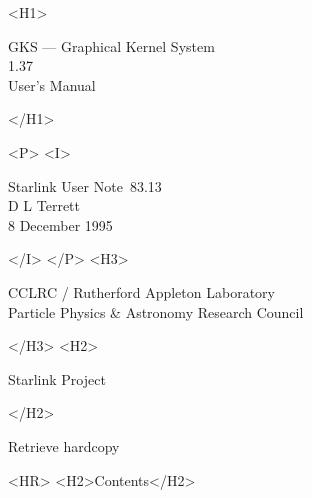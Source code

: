 \documentclass[11pt]{article}
\newcommand{\stardoccategory}  {Starlink User Note}
\newcommand{\stardocsource}    {sun83.13}
\newcommand{\stardocnumber}    {83.13}
\newcommand{\stardocauthors}   {D L Terrett}
\newcommand{\stardocdate}      {8 December 1995}
\newcommand{\stardoctitle}     {GKS --- Graphical Kernel System}
\newcommand{\stardocversion}   {1.37}
\newcommand{\stardocmanual}    {User's Manual}
\newcommand{\htmladdnormallink}[2]{#1}
\newcommand{\htmladdimg}[1]{}
\newcommand{\htmlref}[2]{#1}
\newcommand{\htmladdtonavigation}[1]{}
\newcommand{\xlabel}[1]{}
\newcommand{\latexonlytoc}[0]{\tableofcontents}
\begin{document}
\begin{htmlonly}
   \xlabel{}
   \begin{rawhtml} <H1> \end{rawhtml}
      \stardoctitle\\
      \stardocversion\\
      \stardocmanual
   \begin{rawhtml} </H1> \end{rawhtml}


   \begin{rawhtml} <P> <I> \end{rawhtml}
   \stardoccategory\ \stardocnumber \\
   \stardocauthors \\
   \stardocdate
   \begin{rawhtml} </I> </P> <H3> \end{rawhtml}
      \htmladdnormallink{CCLRC}{http://www.cclrc.ac.uk} /
      \htmladdnormallink{Rutherford Appleton Laboratory}
                        {http://www.cclrc.ac.uk/ral} \\
      \htmladdnormallink{Particle Physics \& Astronomy Research Council}
                        {http://www.pparc.ac.uk} \\
   \begin{rawhtml} </H3> <H2> \end{rawhtml}
      \htmladdnormallink{Starlink Project}{http://www.starlink.ac.uk/}
   \begin{rawhtml} </H2> \end{rawhtml}
   \htmladdnormallink{\htmladdimg{source.gif} Retrieve hardcopy}
      {http://www.starlink.ac.uk/cgi-bin/hcserver?\stardocsource}\\

  \label{stardoccontents}
  \begin{rawhtml}
    <HR>
    <H2>Contents</H2>
  \end{rawhtml}
  \renewcommand{\latexonlytoc}[0]{}
  \htmladdtonavigation{\htmlref{\htmladdimg{contents_motif.gif}}
        {stardoccontents}}

\end{htmlonly}
\end{document}
